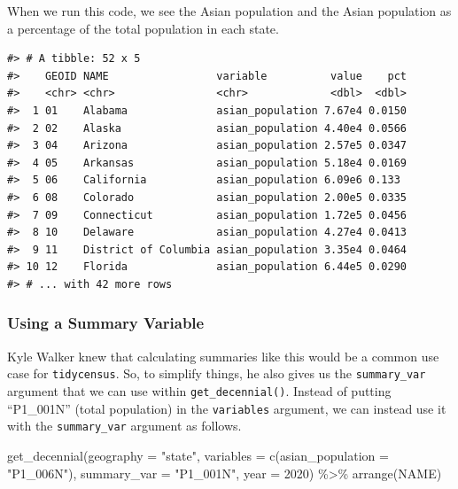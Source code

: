 \documentclass[
]{book}
\newenvironment{Shaded}{\begin{snugshade}}{\end{snugshade}}
\newcommand{\AttributeTok}[1]{\textcolor[rgb]{0.77,0.63,0.00}{#1}}
\newcommand{\DecValTok}[1]{\textcolor[rgb]{0.00,0.00,0.81}{#1}}
\newcommand{\FunctionTok}[1]{\textcolor[rgb]{0.00,0.00,0.00}{#1}}
\newcommand{\NormalTok}[1]{#1}
\newcommand{\SpecialCharTok}[1]{\textcolor[rgb]{0.00,0.00,0.00}{#1}}
\newcommand{\StringTok}[1]{\textcolor[rgb]{0.31,0.60,0.02}{#1}}
\begin{document}
When we run this code, we see the Asian population and the Asian population as a percentage of the total population in each state.

\begin{verbatim}
#> # A tibble: 52 x 5
#>    GEOID NAME                 variable          value    pct
#>    <chr> <chr>                <chr>             <dbl>  <dbl>
#>  1 01    Alabama              asian_population 7.67e4 0.0150
#>  2 02    Alaska               asian_population 4.40e4 0.0566
#>  3 04    Arizona              asian_population 2.57e5 0.0347
#>  4 05    Arkansas             asian_population 5.18e4 0.0169
#>  5 06    California           asian_population 6.09e6 0.133 
#>  6 08    Colorado             asian_population 2.00e5 0.0335
#>  7 09    Connecticut          asian_population 1.72e5 0.0456
#>  8 10    Delaware             asian_population 4.27e4 0.0413
#>  9 11    District of Columbia asian_population 3.35e4 0.0464
#> 10 12    Florida              asian_population 6.44e5 0.0290
#> # ... with 42 more rows
\end{verbatim}

\hypertarget{using-a-summary-variable}{%
\subsubsection*{Using a Summary Variable}\label{using-a-summary-variable}}

Kyle Walker knew that calculating summaries like this would be a common use case for \texttt{tidycensus}. So, to simplify things, he also gives us the \texttt{summary\_var} argument that we can use within \texttt{get\_decennial()}. Instead of putting ``P1\_001N'' (total population) in the \texttt{variables} argument, we can instead use it with the \texttt{summary\_var} argument as follows.

\begin{Shaded}
\begin{Highlighting}[]
\FunctionTok{get\_decennial}\NormalTok{(}\AttributeTok{geography =} \StringTok{"state"}\NormalTok{, }
              \AttributeTok{variables =} \FunctionTok{c}\NormalTok{(}\AttributeTok{asian\_population =} \StringTok{"P1\_006N"}\NormalTok{),}
              \AttributeTok{summary\_var =} \StringTok{"P1\_001N"}\NormalTok{,}
              \AttributeTok{year =} \DecValTok{2020}\NormalTok{) }\SpecialCharTok{\%\textgreater{}\%} 
  \FunctionTok{arrange}\NormalTok{(NAME)}
\end{Highlighting}
\end{Shaded}
\end{document}
